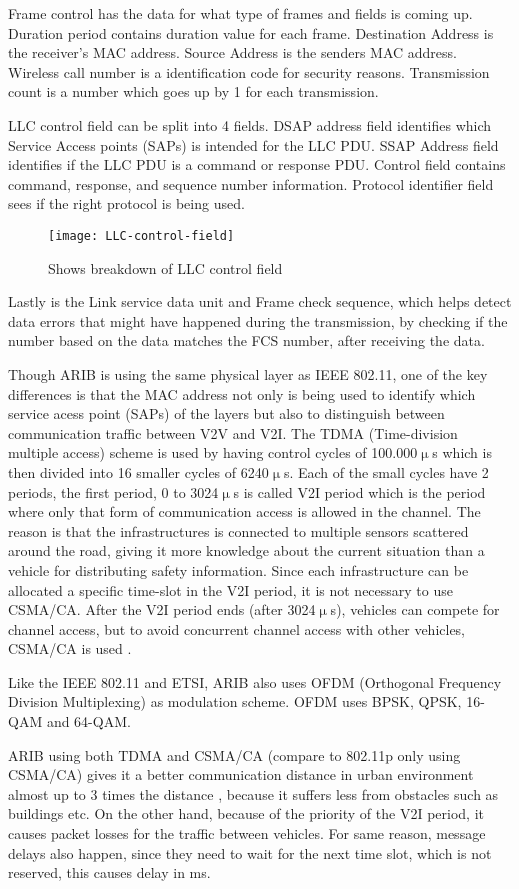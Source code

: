 Frame control has the data for what type of frames and fields is coming up. Duration period contains duration value for each frame. Destination Address is the receiver's MAC address. Source Address is the senders MAC address. Wireless call number is a identification code for security reasons. Transmission count is a number which goes up by 1 for each transmission. 

LLC control field can be split into 4 fields. DSAP address field identifies which Service Access points (SAPs) is intended for the LLC PDU. SSAP Address field identifies if the LLC PDU is a command or response PDU. Control field contains command, response, and sequence number information. Protocol identifier field sees if the right protocol is being used.
\begin{figure}[h]
    \centering
    \texttt{[image: LLC-control-field]}
    \caption{Shows breakdown of LLC control field}
    \label{fig:LLC}
\end{figure}
Lastly is the Link service data unit and Frame check sequence, which helps detect data errors that might have happened during the transmission, by checking if the number based on the data matches the FCS number, after receiving the data. 
\par
% 
Though ARIB is using the same physical layer as IEEE 802.11, one of the key differences is that the MAC address not only is being used to identify which service acess point (SAPs) of the layers but also to distinguish between communication traffic between V2V and V2I. The TDMA (Time-division multiple access) scheme is used by having control cycles of 100.000$\upmu$s which is then divided into 16 smaller cycles of  6240$\upmu$s. Each of the small cycles have 2 periods, the first period, 0 to 3024$\upmu$s is called V2I period which is the period where only that form of communication access is allowed in the channel. The reason is that the infrastructures is connected to multiple sensors scattered around the road, giving it more knowledge about the current situation than a vehicle for distributing safety information. Since each infrastructure can be allocated a specific time-slot in the V2I period, it is not necessary to use CSMA/CA. After the V2I period ends (after 3024$\upmu$s), vehicles can compete for channel access, but to avoid concurrent channel access with other vehicles, CSMA/CA is used \cite{Heinovski2016PerformanceSTD-T109}.\par
% 
Like the IEEE 802.11 and ETSI, ARIB also uses OFDM (Orthogonal Frequency Division 
Multiplexing) as modulation scheme. OFDM uses BPSK, QPSK, 16-QAM and 64-QAM\footnotemark.\par
% 
% 
ARIB using both TDMA and CSMA/CA (compare to 802.11p only using CSMA/CA) gives it a better communication distance in urban environment almost up to 3 times the distance \cite{Heinovski2016PerformanceSTD-T109}, because it suffers less from obstacles such as buildings etc. On the other hand, because of the priority of the V2I period, it causes packet losses for the traffic between vehicles. For same reason, message delays also happen, since they need to wait for the next time slot, which is not reserved, this causes delay in ms. 
